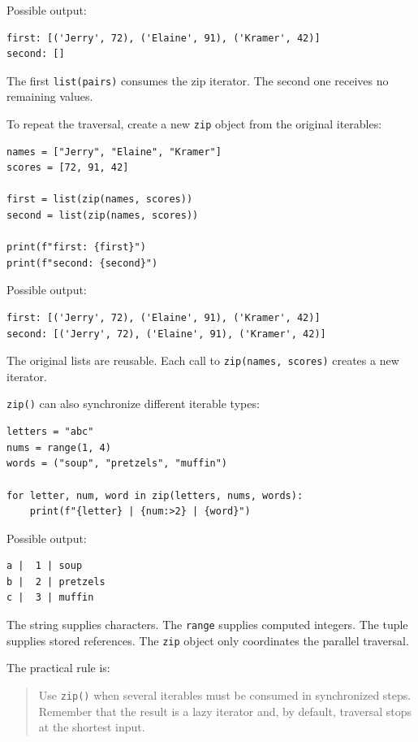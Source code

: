 Possible output:

\begin{verbatim}
first: [('Jerry', 72), ('Elaine', 91), ('Kramer', 42)]
second: []
\end{verbatim}

The first \texttt{list(pairs)} consumes the zip iterator. The second one receives no remaining values.

To repeat the traversal, create a new \texttt{zip} object from the original iterables:

\begin{verbatim}
names = ["Jerry", "Elaine", "Kramer"]
scores = [72, 91, 42]

first = list(zip(names, scores))
second = list(zip(names, scores))

print(f"first: {first}")
print(f"second: {second}")
\end{verbatim}

Possible output:

\begin{verbatim}
first: [('Jerry', 72), ('Elaine', 91), ('Kramer', 42)]
second: [('Jerry', 72), ('Elaine', 91), ('Kramer', 42)]
\end{verbatim}

The original lists are reusable. Each call to \texttt{zip(names, scores)} creates a new iterator.

\texttt{zip()} can also synchronize different iterable types:

\begin{verbatim}
letters = "abc"
nums = range(1, 4)
words = ("soup", "pretzels", "muffin")

for letter, num, word in zip(letters, nums, words):
    print(f"{letter} | {num:>2} | {word}")
\end{verbatim}

Possible output:

\begin{verbatim}
a |  1 | soup
b |  2 | pretzels
c |  3 | muffin
\end{verbatim}

The string supplies characters. The \texttt{range} supplies computed integers. The tuple supplies stored references. The \texttt{zip} object only coordinates the parallel traversal.

The practical rule is:

\begin{quote}
Use \texttt{zip()} when several iterables must be consumed in synchronized steps. Remember that the result is a lazy iterator and, by default, traversal stops at the shortest input.
\end{quote}